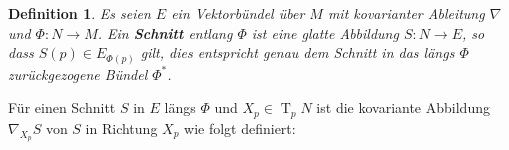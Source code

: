 \documentclass[paper=A4, twoside, chapterprefix=true, bibliography=totoc, headsepline]{scrbook}
\DeclareMathOperator{\T}{T}         %
\theoremstyle{plain}
\newtheorem{Dfn}{Definition}[chapter]
\theoremstyle{nonumberplain}
\theoremstyle{empty}
\theoremstyle{break}
\newcommand{\CmIndex}[2][]{\ifthenelse{\isempty{#1}}{\index{#2}}{\index{#1}}#2}
\newcommand{\CmMark}[2][]{\textbf{\CmIndex[#1]{#2}}}
\begin{document}
\begin{Dfn}
  Es seien $E$ ein Vektorb\"undel \"uber $M$ mit kovarianter Ableitung $\nabla$ und $\Phi: N \to M$.
  Ein \CmMark{Schnitt} entlang $\Phi$ ist eine glatte Abbildung $S: N \to E$, so dass $S(p) \in E_{\Phi(p)}$ gilt, dies entspricht genau dem Schnitt in das l\"angs $\Phi$ zur\"uckgezogene B\"undel $\Phi^*$.
  \begin{center}\end{center}
\end{Dfn}
F\"ur einen Schnitt $S$ in $E$ l\"angs $\Phi$ und $X_p \in \T_pN$ ist die kovariante Abbildung $\nabla_{X_p}S$ von $S$ in Richtung $X_p$ wie folgt definiert:
\end{document}
